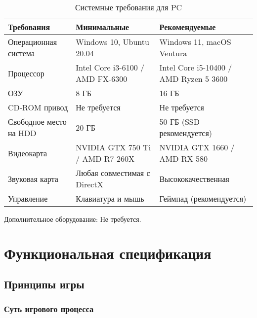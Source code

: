 \documentclass{article}
\begin{document}
\begin{table}[h!]
\centering
\renewcommand{\arraystretch}{1.5}
\begin{tabular}{|l|l|l|}
\hline
\textbf{Требования}           & \textbf{Минимальные}                        & \textbf{Рекомендуемые}                    \\ \hline
Операционная система          & Windows 10, Ubuntu 20.04                    & Windows 11, macOS Ventura                 \\ \hline
Процессор                     & Intel Core i3-6100 / AMD FX-6300            & Intel Core i5-10400 / AMD Ryzen 5 3600    \\ \hline
ОЗУ                           & 8 ГБ                                        & 16 ГБ                                     \\ \hline
CD-ROM привод                 & Не требуется                               & Не требуется                             \\ \hline
Свободное место на HDD        & 20 ГБ                                       & 50 ГБ (SSD рекомендуется)                \\ \hline
Видеокарта                    & NVIDIA GTX 750 Ti / AMD R7 260X             & NVIDIA GTX 1660 / AMD RX 580             \\ \hline
Звуковая карта                & Любая совместимая с DirectX                 & Высококачественная                       \\ \hline
Управление                    & Клавиатура и мышь                           & Геймпад (рекомендуется)                  \\ \hline
\end{tabular}
\caption{Системные требования для PC}
\end{table}

Дополнительное оборудование: Не требуется.

\section{Функциональная спецификация}

\subsection{Принципы игры}

\subsubsection{Суть игрового процесса}
\end{document}
